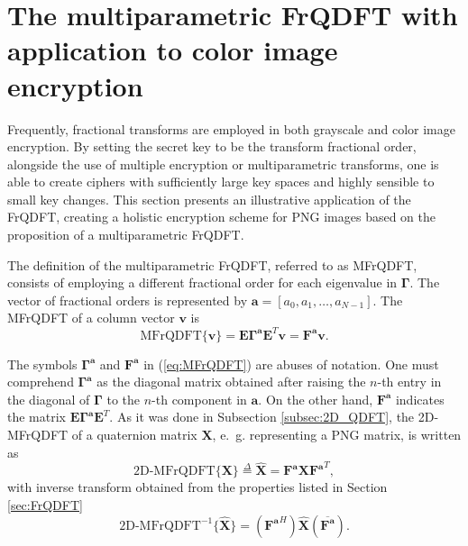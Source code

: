 \section{The multiparametric FrQDFT with application to color image encryption}
\label{sec:multi}
Frequently, fractional transforms are employed in both grayscale \cite{tao2010image} and color image \cite{kang2018reality, kang2018color} encryption. By setting the secret key to be the transform fractional order, alongside the use of multiple encryption or multiparametric transforms, one is able to create ciphers with sufficiently large key spaces and highly sensible to small key changes. This section presents an illustrative application of the FrQDFT, creating a holistic encryption scheme for PNG images based on the proposition of a multiparametric FrQDFT.

The definition of the multiparametric FrQDFT, referred to as MFrQDFT, consists of employing a different fractional order for each eigenvalue in $ \mathbf{\Gamma} $. The vector of fractional orders is represented by $ \mathbf{a} = [a_0, a_1, \dots, a_{N-1}] $. The MFrQDFT of a column vector $ \mathbf{v} $ is
\begin{equation}
\label{eq:MFrQDFT}
\text{MFrQDFT}\{ \mathbf{v} \} = \mathbf{E} \mathbf{\Gamma^a} \mathbf{E}^T \mathbf{v} = \mathbf{F^a} \mathbf{v}.
\end{equation}

The symbols $ \mathbf{\Gamma^a} $ and $ \mathbf{F^a} $ in (\ref{eq:MFrQDFT}) are abuses of notation. One must comprehend $ \mathbf{\Gamma^a} $ as the diagonal matrix obtained after raising the $ n $-th entry in the diagonal of $ \mathbf{\Gamma} $ to the $ n $-th component in $ \mathbf{a} $. On the other hand, $ \mathbf{F^a} $ indicates the matrix $ \mathbf{E} \mathbf{\Gamma^a} \mathbf{E}^T $. As it was done in Subsection \ref{subsec:2D_QDFT}, the 2D-MFrQDFT of a quaternion matrix $ \mathbf{X} $, e.~g. representing a PNG matrix, is written as
\begin{equation}
\label{eq:2DMFrQDFT}
\text{2D-MFrQDFT}\{\mathbf{X} \} \overset{\Delta}{=} \mathbf{\widehat{X}} = \mathbf{F^a} \mathbf{X} \mathbf{F^a}^T,
\end{equation}
with inverse transform obtained from the properties listed in Section \ref{sec:FrQDFT}
\begin{equation}
\label{eq:2DMFrQDFTinv}
\text{2D-MFrQDFT}^{-1}\{ \mathbf{\widehat{X}} \} = (\mathbf{F^a}^H) \mathbf{\widehat{X}} (\overline{\mathbf{F^a}}).
\end{equation}

